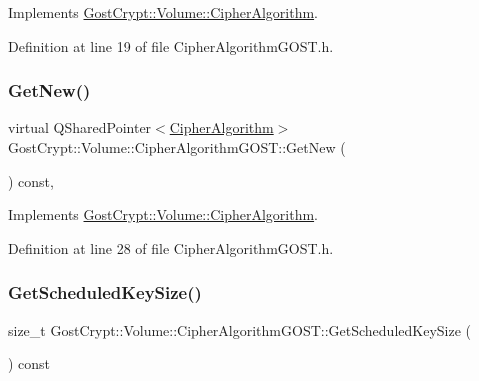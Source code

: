 Implements \hyperlink{class_gost_crypt_1_1_volume_1_1_cipher_algorithm_a6074cb14cf571b9879eb9f6ac85c1487}{Gost\+Crypt\+::\+Volume\+::\+Cipher\+Algorithm}.



Definition at line 19 of file Cipher\+Algorithm\+G\+O\+S\+T.\+h.

\mbox{\label{class_gost_crypt_1_1_volume_1_1_cipher_algorithm_g_o_s_t_abfef648c71b6819f9b75647f0a291f1b}} 
\subsubsection{\texorpdfstring{Get\+New()}{GetNew()}}
{\footnotesize\ttfamily virtual Q\+Shared\+Pointer$<$\hyperlink{class_gost_crypt_1_1_volume_1_1_cipher_algorithm}{Cipher\+Algorithm}$>$ Gost\+Crypt\+::\+Volume\+::\+Cipher\+Algorithm\+G\+O\+S\+T\+::\+Get\+New (\begin{DoxyParamCaption}{ }\end{DoxyParamCaption}) const\hspace{0.3cm}{\ttfamily [inline]}, {\ttfamily [virtual]}}



Implements \hyperlink{class_gost_crypt_1_1_volume_1_1_cipher_algorithm_a623a1b2ec1b28d583e432f3915eccfc4}{Gost\+Crypt\+::\+Volume\+::\+Cipher\+Algorithm}.



Definition at line 28 of file Cipher\+Algorithm\+G\+O\+S\+T.\+h.

\mbox{\label{class_gost_crypt_1_1_volume_1_1_cipher_algorithm_g_o_s_t_aecf6aeaabec9d6bb23babf7fbfc43a93}} 
\subsubsection{\texorpdfstring{Get\+Scheduled\+Key\+Size()}{GetScheduledKeySize()}}
{\footnotesize\ttfamily size\+\_\+t Gost\+Crypt\+::\+Volume\+::\+Cipher\+Algorithm\+G\+O\+S\+T\+::\+Get\+Scheduled\+Key\+Size (\begin{DoxyParamCaption}{ }\end{DoxyParamCaption}) const\hspace{0.3cm}{\ttfamily [virtual]}}



